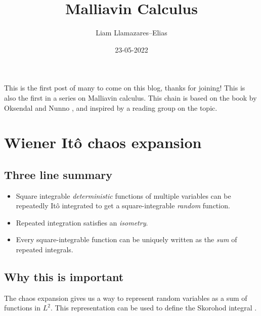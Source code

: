 \documentclass[13pt]{article}
\begin{document}
\title{Malliavin Calculus}
\author{Liam Llamazares--Elias}
\date{23-05-2022}
\maketitle
This is the first post of many to come on this blog, thanks for joining! This is also the first in a series on Malliavin calculus. This chain is
based on the book by Oksendal and Nunno \cite{nunno2008malliavin}, and inspired by a reading group on the topic.
\section{Wiener Itô chaos expansion}
\subsection{Three line summary}
\begin{itemize}
	\item Square integrable  \textit{deterministic} functions of multiple variables can be repeatedly Itô integrated to get a square-integrable \emph{random} function.
	\item  Repeated integration satisfies an \textit{isometry}.
	\item Every square-integrable function can be uniquely written as the \textit{sum} of repeated integrals.
\end{itemize}
\subsection{Why this is important}
The chaos expansion gives us a way to represent random variables as a sum of functions in $L^2$. This representation can be used to define the Skorohod integral \cite{Skorohodblog}.
\end{document}
